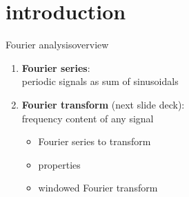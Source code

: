 


\subtitle{Part 7: Fourier Series}


	

\section{introduction}
        \begin{frame}{Fourier analysis}{overview}
            \begin{enumerate}
                \item   \textbf{Fourier series}:\\ periodic signals as sum of sinusoidals
                \bigskip
                \item   \textbf{Fourier transform} (next slide deck):\\ frequency content of any signal
                    \begin{itemize}
                        \item   Fourier series to transform
                        \item   properties
                        \item   windowed Fourier transform
                    \end{itemize}
            \end{enumerate}
        \end{frame}

